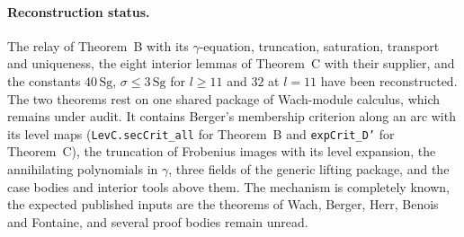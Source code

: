 \documentclass[11pt,letterpaper]{article}
\numberwithin{equation}{section}
\begin{document}
\paragraph{Reconstruction status.} The relay of Theorem~B with its $\gamma$-equation, truncation, saturation, transport and uniqueness, the eight interior lemmas of Theorem~C with their supplier, and the constants $40\,\mathrm{Sg}$, $\sigma\le3\,\mathrm{Sg}$ for $l\ge11$ and $32$ at $l=11$ have been reconstructed. The two theorems rest on one shared package of Wach-module calculus, which remains under audit. It contains Berger's membership criterion along an arc with its level maps (\texttt{LevC.secCrit\_all} for Theorem~B and \texttt{expCrit\_D'} for Theorem~C), the truncation of Frobenius images with its level expansion, the annihilating polynomials in $\gamma$, three fields of the generic lifting package, and the case bodies and interior tools above them. The mechanism is completely known, the expected published inputs are the theorems of Wach, Berger, Herr, Benois and Fontaine, and several proof bodies remain unread.
\end{document}
